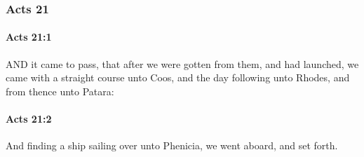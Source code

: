 	\subsubsection{Acts 21} %
		\label{ACTS-21}
		
		\paragraph{Acts 21:1} %
			\label{ACTS-21-1}

			AND it came to pass, that after we were gotten from them, and had launched, we came with a straight course unto Coos, and the day following unto Rhodes, and from thence unto Patara:

			\begin{framed}
			\scriptsize
				\begin{compactdesc}
					\item[SBLG] 
				\end{compactdesc}
			\end{framed}

		\paragraph{Acts 21:2} %
			\label{ACTS-21-2}

			And finding a ship sailing over unto Phenicia, we went aboard, and set forth.

